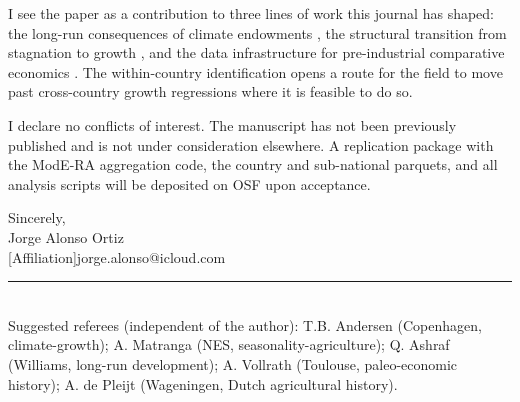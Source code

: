 \documentclass[11pt,letterpaper]{article}
\begin{document}
I see the paper as a contribution to three lines of work this journal has shaped: the long-run consequences of climate endowments \citep{andersen2017climate, olsson2005}, the structural transition from stagnation to growth \citep{galor2002natural, voigtlander2013how}, and the data infrastructure for pre-industrial comparative economics \citep{ashraf2011dynamics}. The within-country identification opens a route for the field to move past cross-country growth regressions where it is feasible to do so.

I declare no conflicts of interest. The manuscript has not been previously published and is not under consideration elsewhere. A replication package with the ModE-RA aggregation code, the country and sub-national parquets, and all analysis scripts will be deposited on OSF upon acceptance.

\bigskip

\noindent Sincerely,\\[0.4em]
Jorge Alonso Ortiz\\[0.2em]
\small\textcolor{mutedgray}{[Affiliation]\quad\textbar\quad jorge.alonso@icloud.com}

\bigskip

\textcolor{mutedgray}{\rule{0.22\linewidth}{0.4pt}}\\[0.2em]
{\footnotesize\textcolor{mutedgray}{Suggested referees (independent of the author):}
T.B. Andersen (Copenhagen, climate-growth); A. Matranga (NES, seasonality-agriculture); Q. Ashraf (Williams, long-run development); A. Vollrath (Toulouse, paleo-economic history); A. de Pleijt (Wageningen, Dutch agricultural history).}
\end{document}
